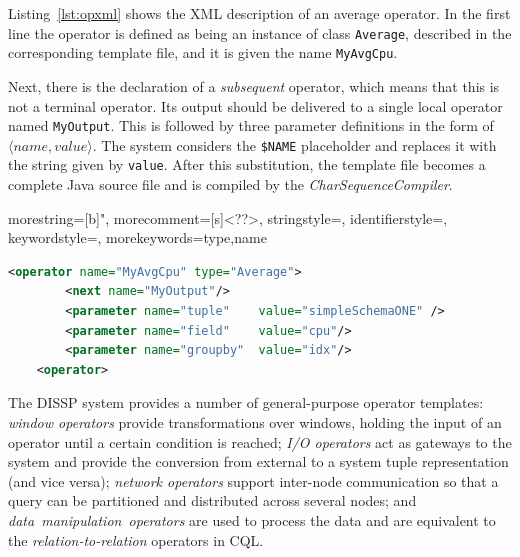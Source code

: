 Listing~\ref{lst:opxml} shows the XML description of an average operator. In the first line the
operator is defined as being an instance of class \texttt{Average}, described in the corresponding
template file, and it is given the name \texttt{MyAvgCpu}. 

Next, there is the declaration of a \textit{subsequent} operator, which means that this is not a terminal
operator. Its output should be delivered to a single local operator named \texttt{MyOutput}. 
This is followed by three parameter definitions in the form of $\langle name,
value \rangle$. The system considers the \texttt{\$NAME} placeholder and replaces it with the string
given by \texttt{value}. After this substitution, the template file becomes a
complete Java source file and is compiled by the \textit{CharSequenceCompiler}.

{
  morestring=[b]",
  morecomment=[s]{<?}{?>},
  stringstyle=\color{BrickRed},
  identifierstyle=\color{NavyBlue},
  keywordstyle=\color{ForestGreen}, 
  morekeywords={type,name}%
}
\noindent\begin{minipage}{\textwidth}
\begin{lstlisting}[language=XML,label=lst:opxml,caption=XML description of an Average operator]
	<operator name="MyAvgCpu" type="Average">
	    <next name="MyOutput"/>
	    <parameter name="tuple"    value="simpleSchemaONE" />
	    <parameter name="field"    value="cpu"/>
	    <parameter name="groupby"  value="idx"/>
	<operator>
\end{lstlisting}
\end{minipage}	
\clearpage
The DISSP system provides a number of general-purpose operator templates: \textit{window operators}
provide transformations over windows, holding the input of an operator until a certain condition is
reached; \textit{I/O operators} act as gateways to the system and provide the conversion from
external to a system tuple representation (and vice versa); \textit{network operators} support
inter-node communication so that a query can be partitioned and distributed across several nodes;
and \textit{\mbox{data manipulation operators}} are used to process the data and are equivalent to the
\textit{relation-to-relation} operators in CQL.

